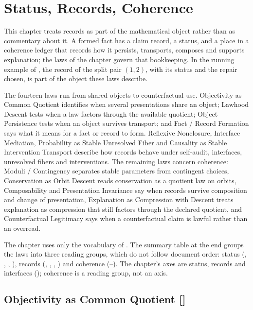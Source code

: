 \section{Status, Records, Coherence}\label{sec:status-records-coherence}

This chapter treats records as part of the mathematical object rather
than as commentary about it.  A formed fact has a claim record, a
status, and a place in a coherence ledger that records how it
persists, transports, composes and supports explanation; the laws of
the chapter govern that bookkeeping.  In the running example of
, the record of the split pair \((1,2)\), with its
status and the repair chosen, is part of the object these laws
describe.

The fourteen laws run from shared objects to counterfactual use.
Objectivity as Common Quotient identifies when several presentations
share an object; Lawhood Descent tests when a law factors through the
available quotient; Object Persistence tests when an object survives
transport; and Fact / Record Formation says what it means for a fact
or record to form.  Reflexive Nonclosure, Interface Mediation,
Probability as Stable Unresolved Fiber and Causality as Stable
Intervention Transport describe how records behave under self-audit,
interfaces, unresolved fibers and interventions.  The remaining laws
concern coherence: Moduli / Contingency separates stable parameters
from contingent choices, Conservation as Orbit Descent reads
conservation as a quotient law on orbits, Composability and
Presentation Invariance say when records survive composition and change
of presentation, Explanation as Compression with Descent treats
explanation as compression that still factors through the declared
quotient, and Counterfactual Legitimacy says when a counterfactual
claim is lawful rather than an overread.

The chapter uses only the vocabulary of .  The
summary table at the end groups the laws into three reading groups,
which do not follow document order: status (, ,
, ), records (, , ,
) and coherence (--).  The chapter's axes
are status, records and interfaces ();
coherence is a reading group, not an axis.

\subsection{Objectivity as Common Quotient [\texorpdfstring{}{F17}]}\label{sec:status-records-coherence:objectivity}

